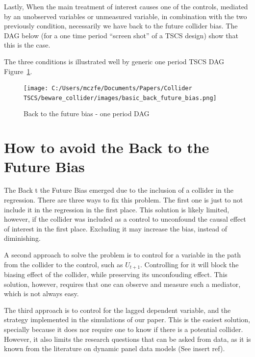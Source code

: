 \documentclass[
  super,
  preprint,
  3p]{elsarticle}
\begin{document}
Lastly, When the main treatment of interest causes one of the controls,
mediated by an unobserved variables or unmeasured variable, in
combination with the two previously condition, necessarily we have back
to the future collider bias. The DAG below (for a one time period
``screen shot'' of a TSCS design) show that this is the case.

The three conditions is illustrated well by generic one period TSCS DAG
Figure~\ref{fig-generic_dag}.

\begin{figure}

{\centering \texttt{[image: C:/Users/mczfe/Documents/Papers/Collider TSCS/beware\_collider/images/basic\_back\_future\_bias.png]}

}

\caption{\label{fig-generic_dag}Back to the future bias - one period
DAG}

\end{figure}

\hypertarget{how-to-avoid-the-back-to-the-future-bias}{%
\section{How to avoid the Back to the Future
Bias}\label{how-to-avoid-the-back-to-the-future-bias}}

The Back t the Future Bias emerged due to the inclusion of a collider in
the regression. There are three ways to fix this problem. The first one
is just to not include it in the regression in the first place. This
solution is likely limited, however, if the collider was included as a
control to unconfound the causal effect of interest in the first place.
Excluding it may increase the bias, instead of diminishing.

A second approach to solve the problem is to control for a variable in
the path from the collider to the control, such as \(U_{t+1}\).
Controlling for it will block the biasing effect of the collider, while
preserving its unconfouding effect. This solution, however, requires
that one can observe and measure such a mediator, which is not always
easy.

The third approach is to control for the lagged dependent variable, and
the strategy implemented in the simulations of our paper. This is the
easiest solution, specially because it does nor require one to know if
there is a potential collider. However, it also limits the research
questions that can be asked from data, as it is known from the
literature on dynamic panel data models (See insert ref).
\end{document}
